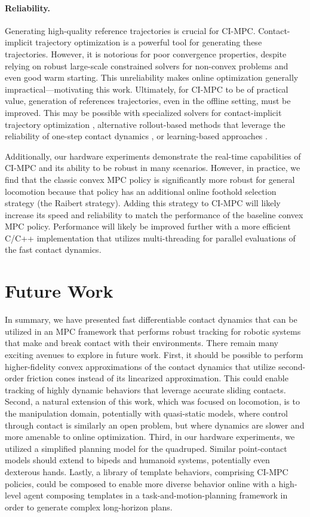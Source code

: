 \paragraph{Reliability.}
Generating high-quality reference trajectories is crucial for CI-MPC. Contact-implicit trajectory optimization \cite{posa2014direct, manchester2020variational} is a powerful tool for generating these trajectories. However, it is notorious for poor convergence properties, despite relying on robust large-scale constrained solvers for non-convex problems and even good warm starting. This unreliability makes online optimization generally impractical---motivating this work. Ultimately, for CI-MPC to be of practical value, generation of references trajectories, even in the offline setting, must be improved. This may be possible with specialized solvers for contact-implicit trajectory optimization \cite{howell2022calipso}, alternative rollout-based methods that leverage the reliability of one-step contact dynamics \cite{howell2022trajectory}, or learning-based approaches \cite{heess2017emergence}.

Additionally, our hardware experiments demonstrate the real-time capabilities of CI-MPC and its ability to be robust in many scenarios. However, in practice, we find that the classic convex MPC policy \cite{di2018dynamic} is significantly more robust for general locomotion because that policy has an additional online foothold selection strategy (the Raibert strategy). Adding this strategy to CI-MPC will likely increase its speed and reliability to match the performance of the baseline convex MPC policy. Performance will likely be improved further with a more efficient C/C++ implementation that utilizes multi-threading for parallel evaluations of the fast contact dynamics.

\section{Future Work} \label{cipc_future_work}
In summary, we have presented fast differentiable contact dynamics that can be utilized in an MPC framework that performs robust tracking for robotic systems that make and break contact with their environments. There remain many exciting avenues to explore in future work. First, it should be possible to perform higher-fidelity convex approximations of the contact dynamics that utilize second-order friction cones instead of its linearized approximation. This could enable tracking of highly dynamic behaviors that leverage accurate sliding contacts. Second, a natural extension of this work, which was focused on locomotion, is to the manipulation domain, potentially with quasi-static models, where control through contact is similarly an open problem, but where dynamics are slower and more amenable to online optimization. Third, in our hardware experiments, we utilized a simplified planning model for the quadruped. Similar point-contact models should extend to bipeds and humanoid systems, potentially even dexterous hands. Lastly, a library of template behaviors, comprising CI-MPC policies, could be composed to enable more diverse behavior online with a high-level agent composing templates in a task-and-motion-planning framework in order to generate complex long-horizon plans.


